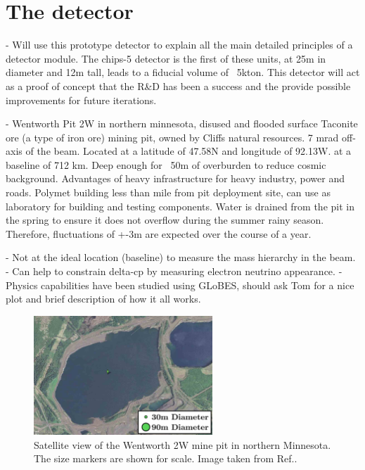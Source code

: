 \section{The \chipsfive detector} %
\label{sec:chips_detector} %

- Will use this prototype detector to explain all the main detailed principles of a \chips
detector module. The chips-5 detector is the first of these units, at 25m in diameter and 12m
tall, leads to a fiducial volume of ~5kton. This detector will act as a proof of concept that the
R\&D has been a success and the provide possible improvements for future iterations.

- Wentworth Pit 2W in northern minnesota, disused and flooded surface Taconite ore (a type of iron
ore) mining pit, owned by Cliffs natural resources. 7 mrad off-axis of the \numi beam. Located at
a latitude of 47.58N and longitude of 92.13W. at a baseline of 712 km. Deep enough for ~50m of
overburden to reduce cosmic background. Advantages of heavy infrastructure for heavy industry,
power and roads. Polymet building less than mile from pit deployment site, can use as laboratory
for building and testing components. Water is drained from the pit in the spring to ensure it does
not overflow during the summer rainy season. Therefore, fluctuations of +-3m are expected over the
course of a year.

- Not at the ideal location (baseline) to measure the mass hierarchy in the \numi beam.
- Can help to constrain delta-cp by measuring electron neutrino appearance.
- Physics capabilities have been studied using GLoBES, should ask Tom for a nice plot and brief
description of how it all works.

\begin{figure} %
    \includegraphics[width=0.6\textwidth]{diagrams/4-chips/location.png}
    \caption[Satellite view of the Wentworth 2W mine pit.]
    {Satellite view of the Wentworth 2W mine pit in northern Minnesota.
        The size markers are shown for scale. Image taken from Ref.\cite{adamson2013}.}
    \label{fig:location}
\end{figure}

